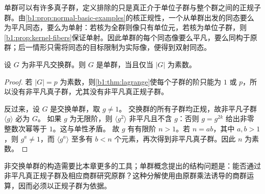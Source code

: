 \ProseParagraphBreak
单群可以有许多真子群，定义排除的只是真正介于单位子群与整个群之间的正规子群。由\cref{b1:prop:normal-basic-examples}的核正规性，一个从单群出发的同态要么为平凡同态，要么为单射：若核为全群则像只有单位元，若核为单位子群，则\cref{b1:prop:kernel-fibers}保证单射。因此单群的每个同态像要么平凡，要么同构于原群；后一情形只需将同态的目标限制为实际像，便得到双射同态。

\begin{proposition}\label{b1:prop:abelian-simple}
	设 \(G\) 为非平凡交换群。则 \(G\) 是单群，当且仅当 \(|G|\) 为素数。
\end{proposition}

\begin{proof}
	若 \(\lvert G\rvert=p\) 为素数，则\cref{b1:thm:lagrange}使每个子群的阶只能为 \(1\) 或 \(p\)，所以没有非平凡真子群，尤其没有非平凡真正规子群。

	反过来，设 \(G\) 是交换单群，取 \(g\ne1\)。 交换群的所有子群均正规，故非平凡子群 \(\langle g\rangle\) 必为 \(G\)。 如果 \(g\) 为无限阶，则 \(\langle g^2\rangle\) 非平凡且不含 \(g\)：否则 \(g=g^{2k}\) 给出非零整数次幂等于 \(1\)。这与单性矛盾。 故 \(g\) 有有限阶 \(n>1\)。若 \(n=ab\)，其中 \(a,b>1\)，则 \(g^a\ne1\)，而 \(\langle g^a\rangle\) 至多有 \(b<n\) 个元素，再次得到非平凡真子群。因此 \(n\) 为素数。
\end{proof}

非交换单群的构造需要比本章更多的工具；单群概念提出的结构问题是：能否通过非平凡真正规子群及相应商群研究原群？这种分解使用由原群乘法诱导的商群运算，因而必须以正规子群为依据。

